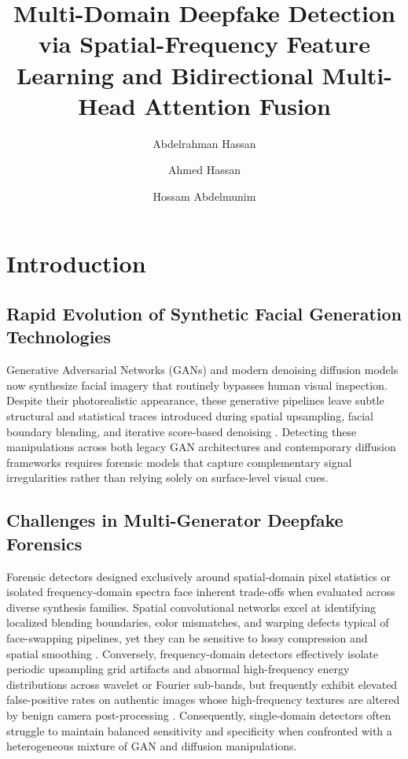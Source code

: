 \documentclass[fleqn,10pt]{wlscirep}
\title{Multi-Domain Deepfake Detection via Spatial-Frequency Feature Learning and Bidirectional Multi-Head Attention Fusion}
\author[1, *]{Abdelrahman Hassan }
\author[2]{Ahmed Hassan }
\author[3]{Hossam Abdelmunim }
\affil[1, 2, 3]{Computer and Systems Engineering Department, Faculty of Engineering, Ain Shams University, Cairo, Egypt}
\affil[*]{2201662@eng.asu.edu.eg }
\begin{document}
\flushbottom
\maketitle
\thispagestyle{empty}

\section*{Introduction}
\subsection*{Rapid Evolution of Synthetic Facial Generation Technologies}
Generative Adversarial Networks (GANs) and modern denoising diffusion models now synthesize facial imagery that routinely bypasses human visual inspection. Despite their photorealistic appearance, these generative pipelines leave subtle structural and statistical traces introduced during spatial upsampling, facial boundary blending, and iterative score-based denoising \cite{ref1, ref2, ref3}. Detecting these manipulations across both legacy GAN architectures and contemporary diffusion frameworks requires forensic models that capture complementary signal irregularities rather than relying solely on surface-level visual cues.

\subsection*{Challenges in Multi-Generator Deepfake Forensics}
Forensic detectors designed exclusively around spatial-domain pixel statistics or isolated frequency-domain spectra face inherent trade-offs when evaluated across diverse synthesis families. Spatial convolutional networks excel at identifying localized blending boundaries, color mismatches, and warping defects typical of face-swapping pipelines, yet they can be sensitive to lossy compression and spatial smoothing \cite{ref4, ref5}. Conversely, frequency-domain detectors effectively isolate periodic upsampling grid artifacts and abnormal high-frequency energy distributions across wavelet or Fourier sub-bands, but frequently exhibit elevated false-positive rates on authentic images whose high-frequency textures are altered by benign camera post-processing \cite{ref8}. Consequently, single-domain detectors often struggle to maintain balanced sensitivity and specificity when confronted with a heterogeneous mixture of GAN and diffusion manipulations.
\end{document}
